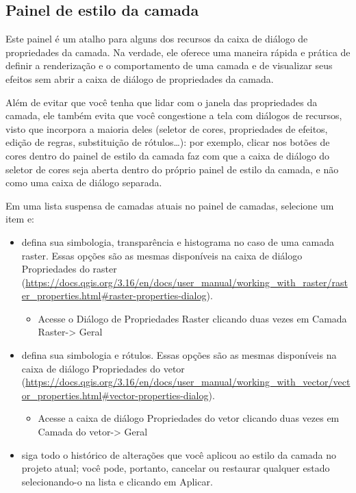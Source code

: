 \documentclass[
]{krantz}
\providecommand{\tightlist}{%
  \setlength{\itemsep}{0pt}\setlength{\parskip}{0pt}}
\begin{document}
\hypertarget{painel-de-estilo-da-camada}{%
\subsection{Painel de estilo da camada}\label{painel-de-estilo-da-camada}}

Este painel é um atalho para alguns dos recursos da caixa de diálogo de propriedades da camada. Na verdade, ele oferece uma maneira rápida e prática de definir a renderização e o comportamento de uma camada e de visualizar seus efeitos sem abrir a caixa de diálogo de propriedades da camada.

Além de evitar que você tenha que lidar com o janela das propriedades da camada, ele também evita que você congestione a tela com diálogos de recursos, visto que incorpora a maioria deles (seletor de cores, propriedades de efeitos, edição de regras, substituição de rótulos\ldots): por exemplo, clicar nos botões de cores dentro do painel de estilo da camada faz com que a caixa de diálogo do seletor de cores seja aberta dentro do próprio painel de estilo da camada, e não como uma caixa de diálogo separada.

Em uma lista suspensa de camadas atuais no painel de camadas, selecione um item e:

\begin{itemize}
\tightlist
\item
  defina sua simbologia, transparência e histograma no caso de uma camada raster. Essas opções são as mesmas disponíveis na caixa de diálogo Propriedades do raster (\url{https://docs.qgis.org/3.16/en/docs/user_manual/working_with_raster/raster_properties.html\#raster-properties-dialog}).

  \begin{itemize}
  \tightlist
  \item
    Acesse o Diálogo de Propriedades Raster clicando duas vezes em Camada Raster-\textgreater{} Geral
  \end{itemize}
\item
  defina sua simbologia e rótulos. Essas opções são as mesmas disponíveis na caixa de diálogo Propriedades do vetor (\href{https://docs.\%20qgis.org/3.16/en/docs/user_manual/working_with_vector/vector_properties.html\#vector-properties-dialog}{https://docs.qgis.org/3.16/en/docs/user\_manual/working\_with\_vector/vector\_properties.html\#vector-properties-dialog}).

  \begin{itemize}
  \tightlist
  \item
    Acesse a caixa de diálogo Propriedades do vetor clicando duas vezes em Camada do vetor-\textgreater{} Geral
  \end{itemize}
\item
  siga todo o histórico de alterações que você aplicou ao estilo da camada no projeto atual; você pode, portanto, cancelar ou restaurar qualquer estado selecionando-o na lista e clicando em Aplicar.
\end{itemize}
\end{document}
